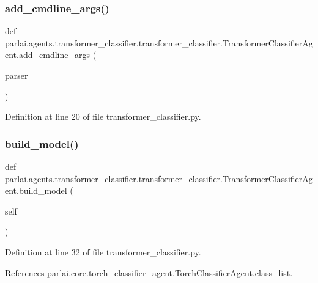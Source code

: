 \subsubsection{\texorpdfstring{add\+\_\+cmdline\+\_\+args()}{add\_cmdline\_args()}}
{\footnotesize\ttfamily def parlai.\+agents.\+transformer\+\_\+classifier.\+transformer\+\_\+classifier.\+Transformer\+Classifier\+Agent.\+add\+\_\+cmdline\+\_\+args (\begin{DoxyParamCaption}\item[{}]{parser }\end{DoxyParamCaption})\hspace{0.3cm}{\ttfamily [static]}}



Definition at line 20 of file transformer\+\_\+classifier.\+py.

\mbox{\label{classparlai_1_1agents_1_1transformer__classifier_1_1transformer__classifier_1_1TransformerClassifierAgent_a10a0e65863e4e7b6a0ac30d3ff6f3c5f}} 
\subsubsection{\texorpdfstring{build\+\_\+model()}{build\_model()}}
{\footnotesize\ttfamily def parlai.\+agents.\+transformer\+\_\+classifier.\+transformer\+\_\+classifier.\+Transformer\+Classifier\+Agent.\+build\+\_\+model (\begin{DoxyParamCaption}\item[{}]{self }\end{DoxyParamCaption})}



Definition at line 32 of file transformer\+\_\+classifier.\+py.



References parlai.\+core.\+torch\+\_\+classifier\+\_\+agent.\+Torch\+Classifier\+Agent.\+class\+\_\+list.

